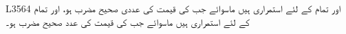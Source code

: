 L3564
  اور  تمام  کے لئے استمراری ہیں ماسوائے جب  کی قیمت  کی عددی صحیح مضرب ہو،  اور  تمام  کے لئے استمراری ہیں ماسوائے جب  کی قیمت  کی  عدد صحیح مضرب ہو۔
